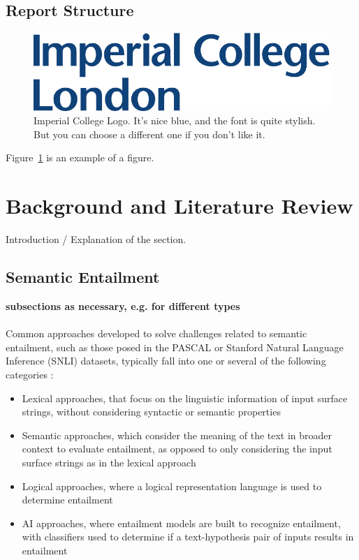 \documentclass[12pt,twoside]{report}
\begin{document}
\section{Report Structure}

\begin{figure}[tb]
\centering
\includegraphics[width = 0.4\hsize]{./figures/imperial}
\caption{Imperial College Logo. It's nice blue, and the font is quite stylish. But you can choose a different one if you don't like it.}
\label{fig:logo}
\end{figure}

Figure~\ref{fig:logo} is an example of a figure. 

\chapter{Background and Literature Review}
Introduction / Explanation of the section.
\section{Semantic Entailment}
\textbf{subsections as necessary, e.g. for different types}
\\
\\
Common approaches developed to solve challenges related to semantic entailment, such as those posed in the PASCAL \cite{dagan2006} or Stanford Natural Language Inference (SNLI) \cite{bowman2015} datasets, typically fall into one or several of the following categories \cite{PARAMASIVAM20229644}:
\begin{itemize}
    \item Lexical approaches, that focus on the linguistic information of input surface strings, without considering syntactic or semantic properties
    \item Semantic approaches, which consider the meaning of the text in broader context to evaluate entailment, as opposed to only considering the input surface strings as in the lexical approach
    \item Logical approaches, where a logical representation language is used to determine entailment
    \item AI approaches, where entailment models are built to recognize entailment, with classifiers used to determine if a text-hypothesis pair of inputs results in entailment 
\end{itemize}
\end{document}
